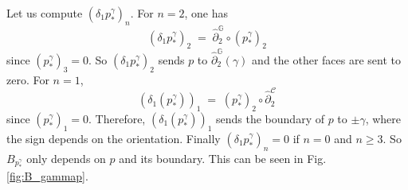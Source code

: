\documentclass[a4paper,12pt,twoside,reqno]{amsart}
\theoremstyle{plain}
\theoremstyle{definition}
\theoremstyle{remark}
\numberwithin{equation}{section}
\numberwithin{figure}{section}
\numberwithin{table}{section}
\newcommand{\f}[1]{\mathcal{#1}}
\newcommand{\n}[1]{\mathbb{#1}}
\begin{document}
	
	
	
	\noindent
	Let us compute $(\delta_1p_*^\gamma)_n$. For $n=2$, one has
	\begin{equation*}
		(\delta_1p_*^\gamma)_2\;=\;\widehat{\partial}^{\n{G}}_2\circ (p_*^\gamma)_2
	\end{equation*}
	since $(p_*^\gamma)_3=0$.
	So $(\delta_1p_*^\gamma)_2$ sends $p$  to $\widehat{\partial}^{\n{G}}_2(\gamma)$ and the other faces are sent to zero. For $n=1$,
	\begin{equation*}
		(\delta_1(p_*^\gamma))_1\;=\;( p_*^\gamma)_2\circ \widehat{\partial}^\f{C}_2
	\end{equation*}
	since $(p_*^\gamma)_1=0$. Therefore, $(\delta_1( p_*^\gamma))_1$ sends the boundary of $p$  to $\pm \gamma$, where the sign depends on the orientation. Finally $(\delta_1p_*^\gamma)_n=0$ if $n=0$ and $n\geqslant3$.
	So $B_{p_*^\gamma}$ only depends on $p$ and its boundary. This can be seen in Fig. \ref{fig:B_gammap}.
	
\end{document}
